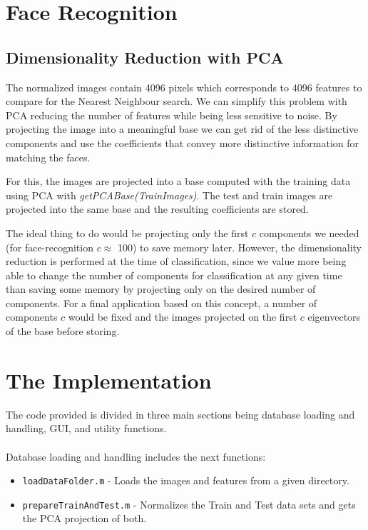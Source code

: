 \documentclass[12pt,a4paper,titlepage]{article}
\begin{document}
\section{Face Recognition}

\subsection{Dimensionality Reduction with PCA}

The normalized images contain 4096 pixels which corresponds to 4096 features to compare for the Nearest Neighbour search. We can simplify this problem with PCA reducing the number of features while being less sensitive to noise. By projecting the image into a meaningful base we can get rid of the less distinctive components and use the coefficients that convey more distinctive information for matching the faces.

For this, the images are projected into a base computed with the training data using PCA with \emph{getPCABase(TrainImages)}. The test and train images are projected into the same base and the resulting coefficients are stored.

The ideal thing to do would be projecting only the first $c$ components we needed (for face-recognition $c \approx$ 100) to save memory later. However, the dimensionality reduction is performed at the time of classification, since we value more being able to change the number of components for classification at any given time than saving some memory by projecting only on the desired number of components. For a final application based on this concept, a number of components $c$ would be fixed and the images projected on the first $c$ eigenvectors of the base before storing.


\section{The Implementation}
The code provided is divided in three main sections being database loading and handling, GUI, and utility functions. 


\paragraph{}Database loading and handling includes the next functions:
\vspace{-0.5em}
\begin{itemize}[itemsep=0.05em]
	\item \texttt{loadDataFolder.m} - Loads the images and features from a given directory.
	\item \texttt{prepareTrainAndTest.m} - Normalizes the Train and Test data sets and gets the PCA projection of both.
\end{itemize}
\end{document}
